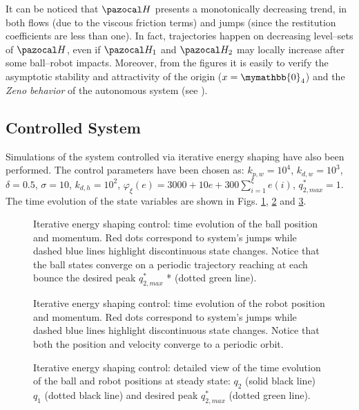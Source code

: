 %
%
It can be noticed that $\Ha$ presents a monotonically decreasing trend, in both flows (due to the viscous friction terms) and jumps (since the restitution coefficients are less than one). In fact, trajectories happen on decreasing level--sets of $\Ha$, even if $\Ha_1$ and $\Ha_2$ may locally increase after some ball--robot impacts. Moreover, from the figures it is easily to verify the asymptotic stability and attractivity of the origin ($x = \mymathbb{0}_4$) and the \textit{Zeno behavior} of the autonomous system (see \cite{goebel2009hybrid}).
\subsection{Controlled System}
%
Simulations of the system controlled via iterative energy shaping have also been performed. The control parameters have been chosen as: $k_{p,w} = 10^4$, $k_{d,w} = 10^3$, $\delta = 0.5$, $\sigma = 10$, $k_{d,h} = 10^2$, $\varphi_\xi(e) = 3000 + 10e + 300\sum_{i = 1}^{\xi}e(i)$, $q_{2,max}^* = 1$. The time evolution of the state variables are shown in Figs. \ref{fig:cb}, \ref{fig:cr} and \ref{fig:cb_d}.
%
\begin{figure}[h]
	\centering
	\caption{Iterative energy shaping control: time evolution of the ball position and momentum. Red dots correspond to system's jumps while dashed blue lines highlight discontinuous state changes. Notice that the ball states converge on a periodic trajectory reaching at each bounce the desired peak $q^*_{2,max}$ * (dotted green line).}
	\label{fig:cb}
\end{figure}
%
%
\begin{figure}[h]
	\centering
	\caption{Iterative energy shaping control: time evolution of the robot position and momentum. Red dots correspond to system's jumps while dashed blue lines highlight discontinuous state changes. Notice that both the position and velocity converge to a periodic orbit.}
	\label{fig:cr}
\end{figure}
%
%

%
\begin{figure}[h]
	\centering
	\caption{Iterative energy shaping control: detailed view of the time evolution of the ball and robot positions at steady state: $q_2$ (solid black line) $q_1$ (dotted black line) and desired peak $q^*_{2,max}$ (dotted green line).}
	\label{fig:cb_d}
\end{figure}
